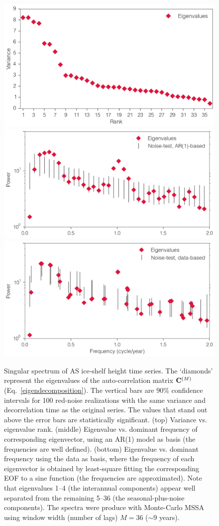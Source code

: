 \begin{figure}[!h]
  \centering
  \includegraphics[width=.639\textwidth]{img/mssa_eigen_var_v3.png}\\
  \includegraphics[width=.659\textwidth]{img/mssa_spec_ar1_v3.png}\\
  \includegraphics[width=.659\textwidth]{img/mssa_spec_data_v3.png}
  \caption[Singular spectrum of AS ice-shelf height time series]{
  \ssp \footnotesize
  Singular spectrum of AS ice-shelf height time series. The `diamonds' represent the eigenvalues of the auto-correlation matrix $\mathbf{C}^{(M)}$ (Eq.~\ref{eigendecomposition}). The vertical bars are 90\% confidence intervals for 100 red-noise realizations with the same variance and decorrelation time as the original series. The values that stand out above the error bars are statistically significant. (top) Variance vs. eigenvalue rank. (middle) Eigenvalue vs. dominant frequency of corresponding eigenvector, using an AR(1) model as basis (the frequencies are well defined). (bottom) Eigenvalue vs. dominant frequency using the data as basis, where the frequency of each eigenvector is obtained by least-square fitting the corresponding EOF to a sine function (the frequencies are approximated). Note that eigenvalues 1--4 (the interannual components) appear well separated from the remaining 5--36 (the seasonal-plus-noise components). The spectra were produce with Monte-Carlo MSSA using window width (number of lags) $M=36$ ($\sim$9 years).
  }
  \label{c4f3}
\end{figure}


